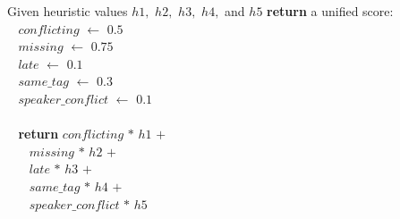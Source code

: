 \begin{tabbing}Given heuristic values $h1$$,$ $h2$$,$ $h3$$,$ $h4$$,$ and $h5$ {\bf return} a unified score$:$\\
$~~~~$$conflicting$ $\leftarrow$ $0.5$\\
$~~~~$$missing$ $\leftarrow$ $0.75$\\
$~~~~$$late$ $\leftarrow$ $0.1$\\
$~~~~$$same\_tag$ $\leftarrow$ $0.3$\\
$~~~~$$speaker\_conflict$ $\leftarrow$ $0.1$\\
\\
$~~~~${\bf return} $conflicting$ $*$ $h1$ $+$\\
$~~~~~~~~$$missing$ $*$ $h2$ $+$\\
$~~~~~~~~$$late$ $*$ $h3$ $+$\\
$~~~~~~~~$$same\_tag$ $*$ $h4$ $+$\\
$~~~~~~~~$$speaker\_conflict$ $*$ $h5$\\
\end{tabbing}